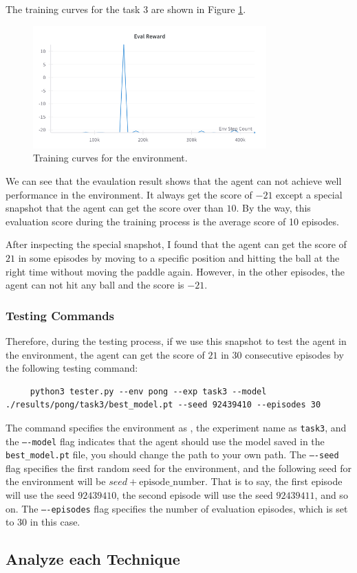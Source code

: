 The training curves for the task 3 are shown in Figure \ref{fig:pong-task3-training-curve}.
\begin{figure}[H]
    \centering
    \includegraphics[width=0.8\textwidth]{figures/task3.png}
    \caption{Training curves for the \pong environment.}
    \label{fig:pong-task3-training-curve}
\end{figure}

We can see that the evaulation result shows that the agent can not achieve well performance in the \pong environment. It always get the score of $-21$ except a special snapshot that the agent can get the score over than $10$.
By the way, this evaluation score during the training process is the average score of 10 episodes.

After inspecting the special snapshot, I found that the agent can get the score of $21$ in some episodes by moving to a specific position and hitting the ball at the right time without moving the paddle again.
However, in the other episodes, the agent can not hit any ball and the score is $-21$.

\subsubsection{Testing Commands}

Therefore, during the testing process, if we use this snapshot to test the agent in the \pong environment, the agent can get the score of $21$ in 30 consecutive episodes by the following testing command:
\begin{verbatim}
     python3 tester.py --env pong --exp task3 --model ./results/pong/task3/best_model.pt --seed 92439410 --episodes 30
\end{verbatim}

The command specifies the environment as \pong, the experiment name as \texttt{task3}, and the \texttt{----model} flag indicates that the agent should use the model saved in the \texttt{best\_model.pt} file, you should change the path to your own path.
The \texttt{----seed} flag specifies the first random seed for the environment, and the following seed for the environment will be $seed + \text{episode\_number}$. That is to say, the first episode will use the seed $92439410$, the second episode will use the seed $92439411$, and so on.
The \texttt{----episodes} flag specifies the number of evaluation episodes, which is set to $30$ in this case.



\subsection{Analyze each Technique}
